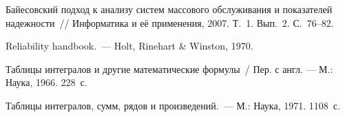 \begin{multicols}{2}
{{\begin{thebibliography}{9}
Байесовский подход к анализу систем массового обслуживания и показателей надежности~// 
Информатика и её применения, 2007. Т.~1. Вып.~2. С.~76--82.

Reliability handbook.~--- Holt, Rinehart \& Winston, 1970.

Таблицы интегралов и другие математические формулы~/ Пер. с англ. --- М.: Наука, 1966. 228~с.


\label{end\stat}

Таблицы интегралов, сумм, рядов и произведений.~--- М.: Наука, 1971.  1108~с.
\end{thebibliography}
}
}
\end{multicols}
